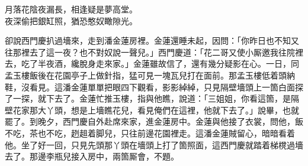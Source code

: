 \begin{myquote}
月落花陰夜漏長，相逢疑是夢高堂。\\夜深偷把銀缸照，猶恐憨奴瞰隙光。
\end{myquote}

卻說西門慶扒過墻來，走到潘金蓮房裡。金蓮還睡未起，因問：「你昨日也不知又往那裡去了這一夜？也不對奴說一聲兒。」西門慶道：「花二哥又使小厮邀我往院裡去，吃了半夜酒，纔脫身走來家。」金蓮雖故信了，還有幾分疑影在心。一日，同孟玉樓飯後在花園亭子上做針指，猛可見一塊瓦兒打在面前。那孟玉樓低着頭納鞋，沒看見。這潘金蓮單單把眼四下觀看，影影綽綽，只見隔壁墻頭上一箇白面探了一探，就下去了。金蓮忙推玉樓，指與他瞧，說道：「三姐姐，你看這箇，是隔壁花家那大丫頭，想是上墻瞧花兒，看見俺們在這裡，他就下去了。」說畢，也就罷了。到晚夕，西門慶自外赴席來家，進金蓮房中。金蓮與他接了衣裳，問他，飯不吃，茶也不吃，趔趄着脚兒，只往前邊花園裡走。{}這潘金蓮賊留心，暗暗看着他。坐了好一回，只見先頭那丫頭在墻頭上打了箇照面，這西門慶就踏着梯櫈過墻去了。那邊李瓶兒接入房中，兩箇厮會，不題。

